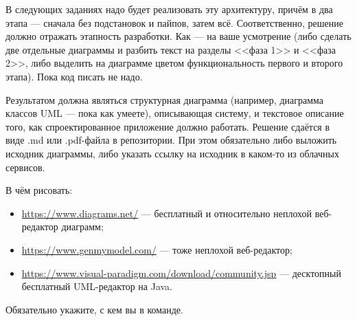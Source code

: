 \documentclass[a5paper]{homework}
\begin{document}
В следующих заданиях надо будет реализовать эту архитектуру, причём в два этапа --- сначала без подстановок и пайпов, затем всё. Соответственно, решение должно отражать этапность разработки. Как --- на ваше усмотрение (либо сделать две отдельные диаграммы и разбить текст на разделы <<фаза 1>> и <<фаза 2>>, либо выделить на диаграмме цветом функциональность первого и второго этапа). Пока код писать не надо.

Результатом должна являться структурная диаграмма (например, диаграмма классов UML --- пока как умеете), описывающая систему, и текстовое описание того, как спроектированное приложение должно работать. Решение сдаётся в виде .md или .pdf-файла в репозитории. При этом обязательно либо выложить исходник диаграммы, либо указать ссылку на исходник в каком-то из облачных сервисов.

В чём рисовать:

\begin{itemize}
    \item \url{https://www.diagrams.net/} --- бесплатный и относительно неплохой веб-редактор диаграмм;
    \item \url{https://www.genmymodel.com/} --- тоже неплохой веб-редактор;
    \item \url{https://www.visual-paradigm.com/download/community.jsp} --- десктопный бесплатный UML-редактор на Java.
\end{itemize}

Обязательно укажите, с кем вы в команде.
\end{document}
